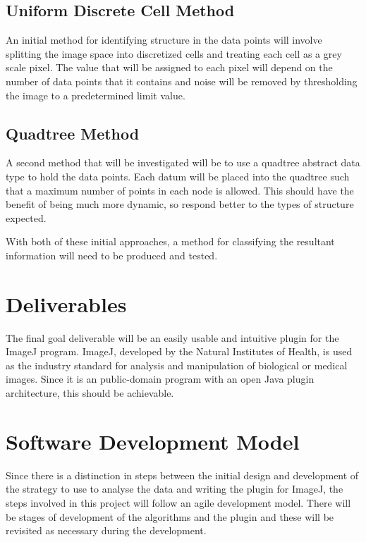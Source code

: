 \subsection{Uniform Discrete Cell Method}
\label{sub:uniform_discrete_cell_method}

An initial method for identifying structure in the data points will involve
splitting the image space into discretized cells and treating each cell as a
grey scale pixel. The value that will be assigned to each pixel will depend on
the number of data points that it contains and noise will be removed by
thresholding the image to a predetermined limit value.

\subsection{Quadtree Method}
\label{sub:quadtree_method}

A second method that will be investigated will be to use a quadtree abstract
data type to hold the data points. Each datum will be placed into the quadtree
such that a maximum number of points in each node is allowed. This should have
the benefit of being much more dynamic, so respond better to the types of
structure expected.

With both of these initial approaches, a method for classifying the resultant
information will need to be produced and tested.

\section{Deliverables}
\label{sec:deliverables}

The final goal deliverable will be an easily usable and intuitive plugin for
the ImageJ program. ImageJ\cite{rasband1997imagej}, developed by the Natural
Institutes of Health, is used as the industry standard for analysis and
manipulation of biological or medical images. Since it is an public-domain
program with an open Java plugin architecture, this should be achievable.

\section{Software Development Model}
\label{sec:software_development_model}

Since there is a distinction in steps between the initial design and development
of the strategy to use to analyse the data and writing the plugin for ImageJ,
the steps involved in this project will follow an agile development model.
There will be stages of development of the algorithms and the plugin and these
will be revisited as necessary during the development.

